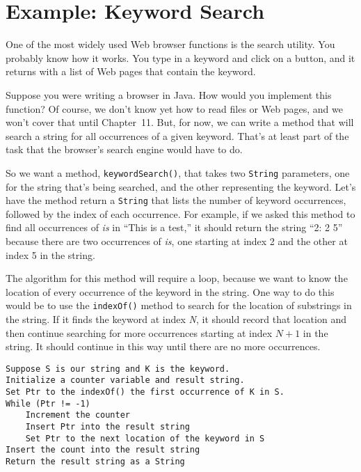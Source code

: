 \section{Example: Keyword Search}
\noindent One of the most widely used Web browser functions is the search
utility.   You probably know how it works.  You type in a keyword and
click on a button, and it returns with a list of Web pages that
contain the keyword.

Suppose you were writing a browser in Java.  How would you implement
this function? Of course, we don't know yet how to read files or Web
pages, and we won't cover that until Chapter~11.
But, for now, we can write a method that will search a string for all
occurrences of a given keyword.  That's at least part of the task that
the browser's search engine would have to do.

So we want a method, {\tt keywordSearch()}, that takes two
{\tt String} parameters, one for the string that's being searched, and the
other representing the keyword.  Let's have the method return a
{\tt String} that lists the number of keyword occurrences, followed
by the index of each occurrence.  For example, if we asked this method
to find all occurrences of {\it is} in ``This is a test,'' it should return
the string ``2: 2 5'' because there are two occurrences of
{\it is}, one starting at index 2 and the other at index 5 in the string.

The algorithm for this method will require a loop, because we want to
know the location of every occurrence of the keyword in the string.
One way to do this would be to use the {\tt indexOf()} method to
search for the location of substrings in the string.   If it finds the
keyword at index {\it N}, it should record that location and then continue
searching for more occurrences starting at index $N+1$ in the string.  It
should continue in this way until there are no more occurrences.

\begin{jjjlisting}
\begin{lstlisting}
Suppose S is our string and K is the keyword.
Initialize a counter variable and result string.
Set Ptr to the indexOf() the first occurrence of K in S.
While (Ptr != -1)
    Increment the counter
    Insert Ptr into the result string
    Set Ptr to the next location of the keyword in S
Insert the count into the result string
Return the result string as a String
\end{lstlisting}
\end{jjjlisting}


